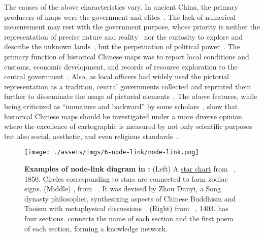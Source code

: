 The causes of the above characteristics vary. 
In ancient China, the primary producers of maps were the government and elites~\cite{Osawa2016Landscape}.
The lack of numerical measurement may rest with the government purpose, whose priority is neither the representation of precise nature and reality~\cite{Yee1994Taking} nor the curiosity to explore and describe the unknown lands~\cite{Osawa2016Landscape}, but the perpetuation of political power~\cite{Yee1994Taking}.
The primary function of historical Chinese maps was to report local conditions and customs, economic development, and records of resource exploration to the central government~\cite{Osawa2016Landscape}.
Also, as local officers had widely used the pictorial representation as a tradition, central governments collected and reprinted them further to disseminate the usage of pictorial elements~\cite{Osawa2016Landscape}.
The above features, while being criticized as ``immature and backward'' by some scholars~\cite{Yee1994Reinterpreting}, show that historical Chinese maps should be investigated under a more diverse opinion where the excellence of cartographic is measured by not only scientific purposes but also social, aesthetic, and even religious standards~\cite{Yee1994Reinterpreting, Jiang2017heritage}.

\begin{figure}[!htb]
    \centering
    \texttt{[image: ./assets/imgs/6-node-link/node-link.png]}
    \caption{
        \textbf{Examples of node-link diagram in \datasetName:}
        (Left)
        A
        \href{https://tile.loc.gov/image-services/iiif/service:asian:lcnclscd:2011457019:1A002:002b003a/full/pct:100/0/default.jpg}{star chart}
        from ~\cite{Xiong1850Yue}, 1850.
        Circles corresponding to stars are connected to form zodiac signs.
        (Middle)
        , 
        from ~\cite{Yang1662Liu}. 
        It was devised by Zhou Dunyi, a Song dynasty philosopher, synthesizing aspects of Chinese Buddhism and Taoism with metaphysical discussions~\cite{Adler1999Zhou}.
        (Right)
        from \term{\SiShuWuJingDaQuan}~\cite{Hu1403Si}, 1403.
         has four sections.
        \term{\SiShiTu} connects the name of each section and the first poem of each section, forming a knowledge network.
    }
    \label{fig:node-link}
\end{figure}


